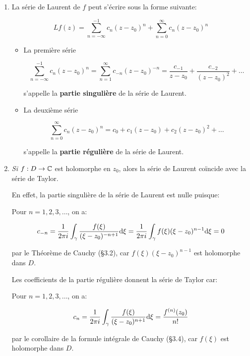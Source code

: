 \begin{remark}\hfill
    
    \begin{enumerate}[label=\alph*)]
        \item 
        La série de Laurent de $f$ peut s'écrire sous la forme suivante:
        
        \[ Lf(z) = \sum_{n = -\infty}^{-1} c_n(z - z_0)^n + \sum_{n = 0}^{\infty} c_n(z - z_0)^n \]
        
        \begin{itemize}
        \item 
        La première série
        
        \[
        \sum_{n = -\infty}^{-1} c_n(z - z_0)^n =
        \sum_{n = 1}^{\infty} c_{-n}(z - z_0)^{-n} =
        \frac{c_{-1}}{z - z_0} + \frac{c_{-2}}{(z - z_0)^2} + \ldots
        \]
        
        s'appelle la \textbf{partie singulière} de la série de Laurent.
        
        \item 
        La deuxième série
        
        \[
        \sum_{n = 0}^{\infty} c_n(z - z_0)^n =
        c_0 + c_1(z - z_0) + c_2(z - z_0)^2 + \ldots
        \]
        
        s'appelle la \textbf{partie régulière} de la série de Laurent.
        \end{itemize}

        \item 
        \textit{Si} $f: D \rightarrow \mathbb{C}$ est holomorphe en $z_0$, alors la série de Laurent coïncide avec la série de Taylor.
        
        En effet, la partie singulière de la série de Laurent est nulle puisque:
        
        Pour $n = 1, 2, 3, \ldots$, on a:
        
        \[ c_{-n} =  \frac{1}{2 \pi i} \int_\gamma \frac{f(\xi)}{(\xi - z_0)^{-n + 1}} \mathrm{d}\xi
        = \frac{1}{2 \pi i} \int_\gamma f(\xi)(\xi - z_0)^{n - 1} \mathrm{d}\xi
        = 0 \]
        
        par le Théorème de Cauchy (§3.2), car $f(\xi)(\xi - z_0)^{n - 1}$ est holomorphe dans $D$.
        
        Les coefficients de la partie régulière donnent la série de Taylor car:
        
        Pour $n = 1, 2, 3, \ldots$, on a:
        
        \[ c_{n} =  \frac{1}{2 \pi i} \int_\gamma \frac{f(\xi)}{(\xi - z_0)^{n + 1}} \mathrm{d}\xi
        = \frac{f^{(n)}(z_0)}{n!}\]
        
        par le corollaire de la formule intégrale de Cauchy (§3.4), car $f(\xi)$ est holomorphe dans $D$.
    \end{enumerate}
\end{remark}

